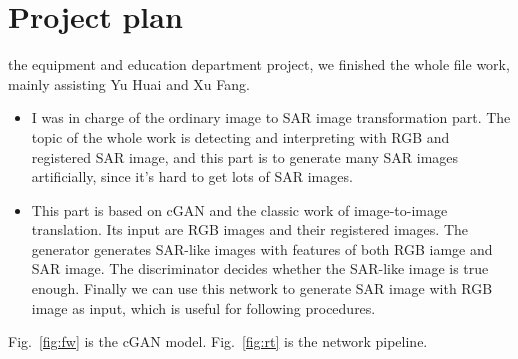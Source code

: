 \documentclass[]{IEEEtran}
\begin{document}
\section{Project plan}
 the equipment and education department project, we finished the whole file work, mainly assisting Yu Huai and Xu Fang.
\begin{itemize}
	\item I was in charge of the ordinary image to SAR image transformation part. The topic of the whole work is detecting and interpreting with RGB and registered SAR image, and this part is to generate many SAR images artificially, since it's hard to get lots of SAR images.
	\item This part is based on cGAN and the classic work of image-to-image translation. Its input are RGB images and their registered images. The generator generates SAR-like images with features of both RGB iamge and SAR image. The discriminator decides whether the SAR-like image is true enough. Finally we can use this network to generate SAR image with RGB image as input, which is useful for following procedures. 
	
\end{itemize}

Fig.~\ref{fig:fw} is the cGAN model. Fig.~\ref{fig:rt} is the network pipeline.

\newpage
\end{document}
